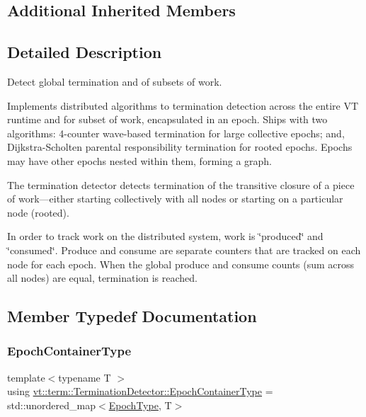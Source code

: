 \subsection*{Additional Inherited Members}


\subsection{Detailed Description}
Detect global termination and of subsets of work. 

Implements distributed algorithms to termination detection across the entire VT runtime and for subset of work, encapsulated in an epoch. Ships with two algorithms\+: 4-\/counter wave-\/based termination for large collective epochs; and, Dijkstra-\/\+Scholten parental responsibility termination for rooted epochs. Epochs may have other epochs nested within them, forming a graph.

The termination detector detects termination of the transitive closure of a piece of work---either starting collectively with all nodes or starting on a particular node (rooted).

In order to track work on the distributed system, work is \char`\"{}produced\char`\"{} and \char`\"{}consumed\char`\"{}. Produce and consume are separate counters that are tracked on each node for each epoch. When the global produce and consume counts (sum across all nodes) are equal, termination is reached. 

\subsection{Member Typedef Documentation}
\mbox{\label{structvt_1_1term_1_1_termination_detector_a69e2615b61e072977463eea5b20b7933}} 
\subsubsection{\texorpdfstring{Epoch\+Container\+Type}{EpochContainerType}}
{\footnotesize\ttfamily template$<$typename T $>$ \\
using \hyperlink{structvt_1_1term_1_1_termination_detector_a69e2615b61e072977463eea5b20b7933}{vt\+::term\+::\+Termination\+Detector\+::\+Epoch\+Container\+Type} =  std\+::unordered\+\_\+map$<$\hyperlink{namespacevt_a985a5adf291c34a3ca263b3378388236}{Epoch\+Type}, T$>$}

